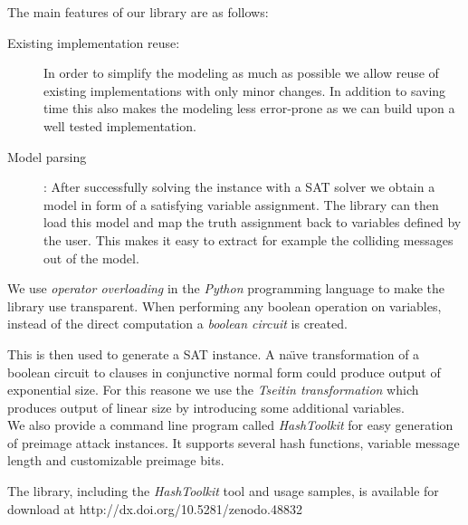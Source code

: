 \documentclass[myposter,portrait]{sciposter}
\begin{document}
\begin{multicols*}{3}
The main features of our library are as follows:

\begin{description}
\item[Existing implementation reuse:] In order to simplify the modeling as much as possible we allow reuse of existing implementations with only minor changes.
In addition to saving time this also makes the modeling less error-prone as we can build upon a well tested implementation.


\item[Model parsing]: After successfully solving the instance with a SAT solver we obtain a model in form of a satisfying variable assignment.
The library can then load this model and map the truth assignment back to variables defined by the user.
This makes it easy to extract for example the colliding messages out of the model.
\end{description}

We use \emph{operator overloading} in the \emph{Python} programming language to make the library use transparent.
When performing any boolean operation on variables, instead of the direct computation a \emph{boolean circuit} is created.

This is then used to generate a SAT instance.
A na\"{\i}ve transformation of a boolean circuit to clauses in conjunctive normal form could produce output of exponential size.
For this reasone we use the \emph{Tseitin transformation} \cite{tseitin1983complexity} which produces output of linear size by introducing some additional variables.
~\\

We also provide a command line program called \emph{HashToolkit} for easy generation of preimage attack instances.
It supports several hash functions, variable message length and customizable preimage bits.
~\\

\begin{minipage}{.65\columnwidth}
The library, including the \emph{HashToolkit} tool and usage samples, is available for download at http://dx.doi.org/10.5281/zenodo.48832
\end{minipage}
\begin{minipage}{.3\columnwidth}
\hfill {}
\end{minipage}


\end{multicols*}
\end{document}
